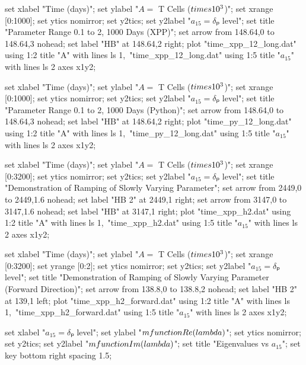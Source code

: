   set xlabel "Time (days)";
  set ylabel "$A = $ T Cells ($\\times 10^3$)";
  set xrange [0:1000];
  set ytics nomirror;
  set y2tics;
  set y2label "$a_{15} = δₚ$ level";
  set title "Parameter Range 0.1 to 2, 1000 Days (XPP)";
  set arrow from 148.64,0 to 148.64,3 nohead;
  set label "HB" at 148.64,2 right;
  plot "time_xpp_12_long.dat" using 1:2 title "A" with lines ls 1,\
       "time_xpp_12_long.dat" using 1:5 title "$a_{15}$" with lines ls 2 axes x1y2;
\stopGNUPLOTscript

  set xlabel "Time (days)";
  set ylabel "$A = $ T Cells ($\\times 10^3$)";
  set xrange [0:1000];
  set ytics nomirror;
  set y2tics;
  set y2label "$a_{15} = δₚ$ level";
  set title "Parameter Range 0.1 to 2, 1000 Days (Python)";
  set arrow from 148.64,0 to 148.64,3 nohead;
  set label "HB" at 148.64,2 right;
  plot "time_py_12_long.dat" using 1:2 title "A" with lines ls 1,\
       "time_py_12_long.dat" using 1:5 title "$a_{15}$" with lines ls 2 axes x1y2;
\stopGNUPLOTscript

  set xlabel "Time (days)";
  set ylabel "$A = $ T Cells ($\\times 10^3$)";
  set xrange [0:3200];
  set ytics nomirror;
  set y2tics;
  set y2label "$a_{15} = δₚ$ level";
  set title "Demonstration of Ramping of Slowly Varying Parameter";
  set arrow from 2449,0 to 2449,1.6 nohead;
  set label "HB 2" at 2449,1 right;
  set arrow from 3147,0 to 3147,1.6 nohead;
  set label "HB" at 3147,1 right;
  plot "time_xpp_h2.dat" using 1:2 title "A" with lines ls 1,\
       "time_xpp_h2.dat" using 1:5 title "$a_{15}$" with lines ls 2 axes x1y2;
\stopGNUPLOTscript

  set xlabel "Time (days)";
  set ylabel "$A = $ T Cells ($\\times 10^3$)";
  set xrange [0:3200];
  set yrange [0:2];
  set ytics nomirror;
  set y2tics;
  set y2label "$a_{15} = δₚ$ level";
  set title "Demonstration of Ramping of Slowly Varying Parameter (Forward Direction)";
  set arrow from 138.8,0 to 138.8,2 nohead;
  set label "HB 2" at 139,1 left;
  plot "time_xpp_h2_forward.dat" using 1:2 title "A" with lines ls 1,\
       "time_xpp_h2_forward.dat" using 1:5 title "$a_{15}$" with lines ls 2 axes x1y2;
\stopGNUPLOTscript

\startGNUPLOTscript[eigenvalues]
  set xlabel "$a_{15} = δₚ$ level";
  set ylabel "$\\mfunction{Re}(\\lambda)$";
  set ytics nomirror;
  set y2tics;
  set y2label "$\\mfunction{Im}(\\lambda)$";
  set title "Eigenvalues vs $a_{15}$";
  set key bottom right spacing 1.5;

